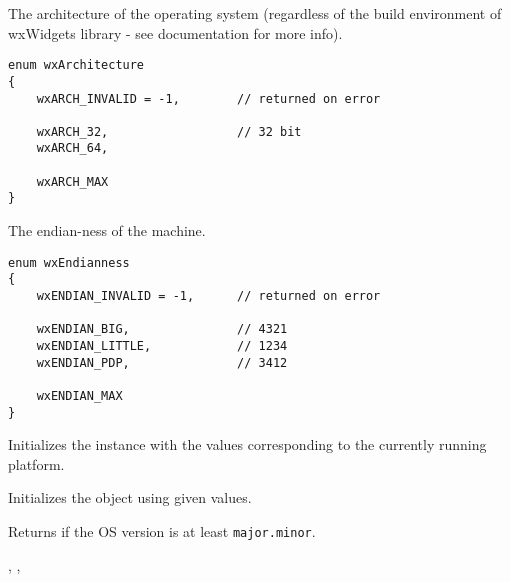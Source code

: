 The architecture of the operating system (regardless of the build environment
of wxWidgets library - see  documentation
for more info).

\begin{verbatim}
enum wxArchitecture
{
    wxARCH_INVALID = -1,        // returned on error

    wxARCH_32,                  // 32 bit
    wxARCH_64,

    wxARCH_MAX
}
\end{verbatim}

The endian-ness of the machine.

\begin{verbatim}
enum wxEndianness
{
    wxENDIAN_INVALID = -1,      // returned on error

    wxENDIAN_BIG,               // 4321
    wxENDIAN_LITTLE,            // 1234
    wxENDIAN_PDP,               // 3412

    wxENDIAN_MAX
}
\end{verbatim}



\label{wxplatforminfowxplatforminfo}


Initializes the instance with the values corresponding to the currently running platform.


Initializes the object using given values.



\label{wxplatforminfocheckosversion}


Returns \true if the OS version is at least \texttt{major.minor}.


,
,


